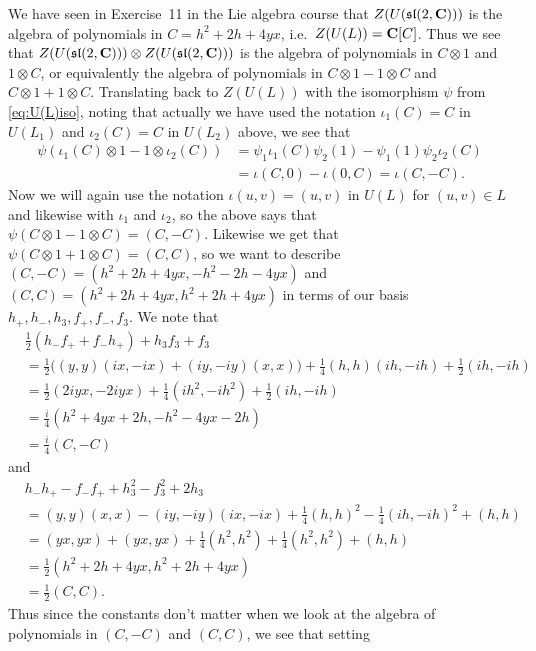 We have seen in Exercise~11 in the Lie algebra course  that $Z(U(\mathfrak{sl}(2,\mathbf{C})))$ is the algebra of polynomials in $C=h^2+2h+4yx$, i.e.\ $Z(U(L))=\mathbf{C}[C]$. Thus we see that $Z(U(\mathfrak{sl}(2,\mathbf{C})))\otimes Z(U(\mathfrak{sl}(2,\mathbf{C})))$ is the algebra of polynomials in $C\otimes 1$ and $1\otimes C$, or equivalently the algebra of polynomials in $C\otimes 1 - 1\otimes C$ and $C\otimes 1 + 1\otimes C$. Translating back to $Z(U(L))$ with the isomorphism $\psi$ from \cref{eq:U(L)iso}, noting that actually we have used the notation $\iota_1(C)=C$ in $U(L_1)$ and $\iota_2(C)=C$ in $U(L_2)$ above, we see that
\begin{align*}
  \psi(\iota_1(C)\otimes 1 - 1\otimes \iota_2(C)) &= \psi_1\iota_1(C)\psi_2(1) - \psi_1(1)\psi_2\iota_2(C) \\
  &= \iota(C,0) - \iota(0,C) = \iota(C,-C).
\end{align*}
Now we will again use the notation $\iota(u,v)=(u,v)$ in $U(L)$ for $(u,v)\in L$ and likewise with $\iota_1$ and $\iota_2$, so the above says that $\psi(C\otimes 1-1\otimes C)=(C,-C)$. Likewise we get that $\psi(C\otimes 1+1\otimes C)=(C,C)$, so we want to describe $(C,-C)=(h^2+2h+4yx,-h^2-2h-4yx)$ and $(C,C)=(h^2+2h+4yx,h^2+2h+4yx)$ in terms of our basis $h_+,h_-,h_3,f_+,f_-,f_3$. We note that
\begin{align*}
  &\tfrac{1}{2}(h_-f_++f_-h_+)+h_3f_3+f_3\\
  &= \tfrac{1}{2}\bigl( (y,y)(ix,-ix) + (iy,-iy)(x,x) \bigr) + \tfrac{1}{4}(h,h)(ih,-ih) + \tfrac{1}{2}(ih,-ih) \\
  &= \tfrac{1}{2}(2iyx,-2iyx) + \tfrac{1}{4}(ih^2,-ih^2) + \tfrac{1}{2}(ih,-ih) \\
  &= \tfrac{i}{4}(h^2+4yx+2h,-h^2-4yx-2h) \\
  &= \tfrac{i}{4}(C,-C)
\end{align*}
and
\begin{align*}
  &h_-h_+ - f_-f_+ + h_3^2 - f_3^2 + 2h_3 \\
  &= (y,y)(x,x) - (iy,-iy)(ix,-ix) + \tfrac{1}{4}(h,h)^2 - \tfrac{1}{4}(ih,-ih)^2 + (h,h) \\
  &= (yx,yx) + (yx,yx) + \tfrac{1}{4}(h^2,h^2) + \tfrac{1}{4}(h^2,h^2) + (h,h) \\
  &= \tfrac{1}{2}(h^2+2h+4yx,h^2+2h+4yx) \\
  &= \tfrac{1}{2}(C,C).
\end{align*}
Thus since the constants don't matter when we look at the algebra of polynomials in $(C,-C)$ and $(C,C)$, we see that setting
